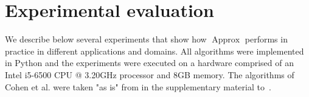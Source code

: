 \documentclass[letterpaper]{article} %
\newtheorem{theorem}[thm]{Theorem}
\DeclareMathOperator{\KlmApprox}{Approx}
\begin{document}








\section{Experimental evaluation}\label{sec:exp}

We describe below several experiments that show how $\KlmApprox$ performs in practice in different applications and domains.
All algorithms were implemented in Python and the experiments were executed on a hardware comprised of an Intel i5-6500 CPU @ 3.20GHz processor and 8GB memory. The algorithms of Cohen et al. were taken "as is" from in the supplementary material to~\cite{cohen2015estimating}.
\end{document}
